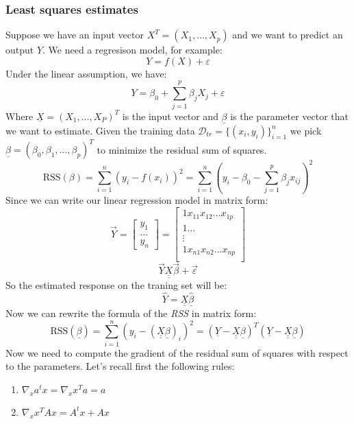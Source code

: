 \subsubsection*{Least squares estimates}
Suppose we have an input vector $X^T = (X_1, \dots, X_p)$ and we want to predict an output $Y$. We need a regresison model, for example:
\[
    Y = f(X) + \varepsilon
\]
Under the linear assumption, we have:
\[
    Y = \beta_0 + \sum_{j=1}^{p} \beta_j X_j + \varepsilon
\]
Where $\underline{X} = (X_1, \dots, X_P)^T$ is the input vector and $\underline{\beta}$ is the parameter vector that we want to estimate.
Given the training data $\mathcal{D}_{tr} = \{ (x_i, y_i) \}_{i=1}^n$
we pick $\underline{\beta} = \left(\beta_0, \beta_1, \dots, \beta_p\right)^T$ to minimize the residual sum of squares.
\[
    \text{RSS}(\beta) = \sum_{i=1}^{n} (y_i - f(x_i))^2 = \sum_{i=1}^{n} \left(y_i - \beta_0 - \sum_{j=1}^{p} \beta_j x_{ij}\right)^2
\]
Since we can write our linear regression model in matrix form:
\[
    \vec{Y} = \begin{bmatrix}
        y_1 \\ \dots \\ y_n
    \end{bmatrix}
    = \begin{bmatrix}
        1 x_{11} x_{12} \dots x_{1p} \\
        1 \dots                      \\
        \vdots                       \\
        1 x_{n1} x_{n2} \dots x_{np} \\
    \end{bmatrix}
\]
\[
    \vec{Y} \underline{\underline{X}} \vec{\beta} + \vec{\varepsilon}
\]
So the estimated response on the traning set will be:
\[
    \hat{Y} = \underline{\underline{X}} \underline{\hat{\beta}}
\]
Now we can rewrite the formula of the \textit{RSS} in matrix form:
\[
    \text{RSS}(\underline{\beta})  = \sum_{i=1}^{n} \left(y_i - (\underline{\underline{X}} \underline{\beta})_i\right)^2 = (\underline{Y} - \underline{\underline{X}} \underline{\beta})^T(\underline{Y} - \underline{\underline{X}} \underline{\beta})
\]
Now we need to compute the gradient of the residual sum of squares with respect to the parameters. Let's recall first the following rules:
\begin{enumerate}
    \item $\nabla_x a^t x = \nabla_x x^T a =  a$
    \item $\nabla_x x^T A x = A^t x + A x$
\end{enumerate}
